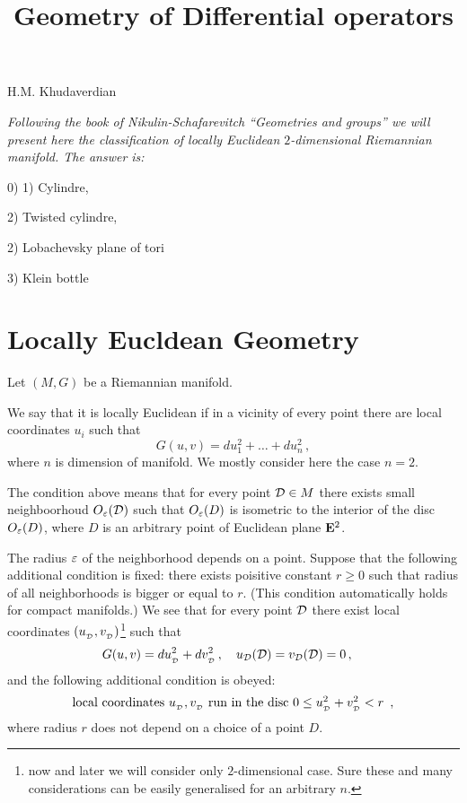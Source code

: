 \documentclass[12pt]{article}
\title{Geometry of Differential operators}
\date{}
\theoremstyle{theorem}
\theoremstyle{lemma}
\numberwithin{equation}{section}
\begin{document}
\maketitle

 \centerline {H.M. Khudaverdian}



 {\it Following the book of Nikulin-Schafarevitch
 ``Geometries and groups''  we will present here
 the classification of 
  locally Euclidean $2$-dimensional Riemannian manifold.   
The answer is:

   0)
 1)  Cylindre,

  2)   Twisted cylindre, 

 2) Lobachevsky plane of tori

 3)  Klein bottle  



  }

\section {Locally Eucldean Geometry}
\label{localeuclidgeometry}

 Let $(M,G)$ be a Riemannian manifold.

  We say that it is locally Euclidean if 
in a vicinity of every point there are 
local coordinates  $u_i$ such that
      \begin{equation*}
     G(u,v)=du_1^2+\dots+du_n^2\,,
        \end{equation*}
where $n$  is dimension of manifold. We mostly consider here
  the case $n=2$.

The condition above means that
for every point ${\cal D}\in M$ there exists small
neighboorhoud $O_{\varepsilon}({\cal D})$  such that $O_{\varepsilon}(D)$
is isometric to the interior of the disc $O_{\varepsilon}(D)$,
where $D$ is an arbitrary point of Euclidean plane ${\bf E}^2$. 

  The radius ${\varepsilon}$ of the neighborhood depends on a point.
Suppose that the following additional condition is fixed:
there exists poisitive constant $r\geq 0$ such that
radius of all neighborhoods is bigger or equal to $r$.
(This condition automatically holds for compact manifolds.)
We see that  for every point  ${\cal D}$ there exist local
coordinates
  $(u_{_{\cal D}},v_{_{\cal D}})$\footnote{now and later we will consider only 
$2$-dimensional case.  Sure these and many considerations can
be easily generalised for an arbitrary $n$.} such that
      \begin{equation}\label{loceuclid}
     G(u,v)=du_{_{\cal D}}^2+dv_{_{\cal D}}^2\,,\quad
    u_{\cal D}({\cal D})=v_{\cal D}({\cal D})=0\,,\quad
         \end{equation}
and the following additional condition is obeyed:
         \begin{equation}\label{stronglyloceuclid}
\hbox {local coordinates $u_{_{\cal D}},v_{_{\cal D}}$ run 
in the disc $0\leq u_{_{\cal D}}^2+v_{_{\cal D}}^2<r $ }\,,   
        \end{equation}
where radius $r$ does not depend on
a choice of a point $D$.
\end{document}
